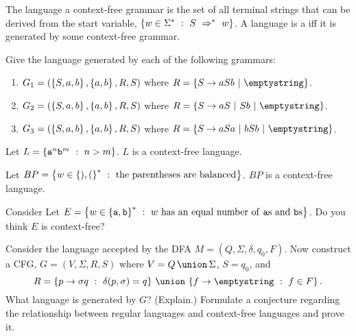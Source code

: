 \documentclass[twoside,letterpaper,openany]{book}
\begin{document}
\begin{defn}
The language  a context-free grammar is the set of all terminal strings that can be derived from the start variable,  $\left\lbrace w \in \Sigma^{*}\ :\ S \ \Rightarrow^*\  w \right\rbrace$. A language is a  iff it is generated by some context-free grammar.
\end{defn}

\begin{exer}\label{exer:cfglangs}
Give the language generated by each of the following grammars:
\begin{enumerate}
\item $G_1 = (\left\lbrace S, a, b \right\rbrace, \left\lbrace a, b \right\rbrace, R, S)$ where $R = \setdef{S \to aSb~|~\emptystring}$.
\item $G_2 = (\left\lbrace S, a, b \right\rbrace, \left\lbrace a, b \right\rbrace, R, S)$ where $R = \setdef{S \to aS ~|~ Sb ~|~\emptystring}$.
\item $G_3 = (\left\lbrace S, a, b \right\rbrace, \left\lbrace a, b \right\rbrace, R, S)$ where $R = \setdef{S \to aSa ~|~ bSb ~|~\emptystring}$.
\end{enumerate}
\end{exer}

\begin{thm}
Let $L = \left\lbrace {\texttt{a}}^n {\texttt{b}}^m\ :\ n > m \right\rbrace$. $L$ is a context-free language.
\end{thm}

\begin{thm}
Let $BP = \left\lbrace w \in \left\lbrace ), ( \right\rbrace^{*}\ :\ \textrm{the parentheses are balanced} \right\rbrace$. $BP$ is a context-free language.
\end{thm}

\begin{exer}
Consider Let $E = \left\lbrace w \in \left\lbrace {\texttt{a}}, {\texttt{b}} \right\rbrace^{*}\ :\ w~\textrm{has an equal number of {\texttt{a}}{s} and {\texttt{b}}{s}} \right\rbrace$. Do you think $E$ is context-free?
\end{exer}

\begin{stmt}
Consider the language accepted by the DFA $M = (Q, \Sigma, \delta, q_0, F)$. Now construct a CFG, $G = (V, \Sigma, R, S)$ where $V = \setunion{Q}{\Sigma}$, $S = q_0$, and 
\[ R = \setunion{\setbuild{p \to \sigma q}{\delta(p, \sigma) = q}}{\setbuild{f \to \emptystring}{f \in F}}. \]
What language is generated by $G$? (Explain.) Formulate a conjecture regarding the relationship between regular languages and context-free languages and prove it.
\end{stmt}
\end{document}
